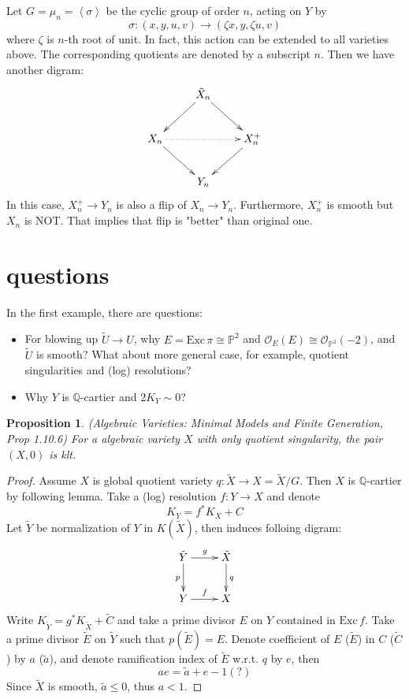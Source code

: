\documentclass{article}
\newtheorem{prop}[defn]{Proposition}
\begin{document}
Let $ G=\mu_n=\left <\sigma\right > $ be the cyclic group of order $ n $, acting on $ Y $ by 
$$ \sigma: (x,y,u,v)\to (\zeta x,y,\zeta u,v) $$
where $ \zeta $ is $ n $-th root of unit. In fact, this action can be extended to all varieties above. The corresponding quotients are denoted by a subscript $ n $. Then we have another digram:
$$ \xymatrix{
	&\tilde{X}_n\ar[ld]\ar[rd]&\\
	X_n\ar[rd]\ar@{.>}[rr]&&X^+_n\ar[ld]\\
	&Y_n&
} $$ 
In this case, $ X^+_n\to Y_n $ is also a flip of $ X_n\to Y_n $. Furthermore, $ X^+_n $ is smooth but $ X_n $ is NOT. That implies that flip is "better" than original one.
\section{questions}
In the first example, there are questions:
\begin{itemize}
	\item  For blowing up $ \tilde{U}\to U $, why $ E=\mathrm{Exc}\,\pi\cong \mathbb{P}^2 $ and $ \mathcal{O}_E(E)\cong \mathcal{O}_{\mathbb{P}^2}(-2) $, and $ \tilde{U} $ is smooth? What about more general case, for example, quotient singularities and (log) resolutions?
	\item Why $ Y $ is $ \mathbb{Q} $-cartier and $ 2K_Y\sim 0 $?
\end{itemize}

\begin{prop}
	(Algebraic Varieties: Minimal Models and Finite	Generation, Prop 1.10.6) For a algebraic variety $ X $ with only quotient singularity, the pair $ (X,0) $ is klt.
\end{prop}
\begin{proof}
	Assume $ X $ is global quotient variety $ q:\tilde{X}\to X=\tilde{X}/G $. Then $ X $ is $ \mathbb{Q} $-cartier by following lemma. Take a (log) resolution $ f:Y\to X $ and denote 
	$$ K_Y=f^*K_X+C $$
	Let $ \tilde{Y} $ be normalization of $ Y $ in $ K(\tilde{X}) $, then induces folloing digram:
	$$ \xymatrix{
		\tilde{Y}\ar[r]^{g}\ar[d]_{p}&\tilde{X}\ar[d]^q\\
		Y\ar[r]^f&X
	} $$
	Write $ K_{\tilde{Y}}=g^*K_{\tilde{X}}+\tilde{C} $ and take a prime divisor $ E $ on $ Y $ contained in $ \mathrm{Exc}\, f $. Take a prime divisor $ \tilde{E} $ on $ \tilde{Y} $ such that $ p(\tilde{E})=E $. Denote coefficient of $ E $ ($ \tilde{E} $) in $ C $ ($ \tilde{C} $) by $ a $ ($ \tilde{a} $), and denote ramification index of $ \tilde{E} $ w.r.t. $ q $ by $ e $, then
	$$ ae=\tilde{a}+e-1 (?)$$
	Since $ \tilde{X} $ is smooth,  $ \tilde{a}\leqslant0 $, thus $ a<1 $.
\end{proof}
\end{document}
